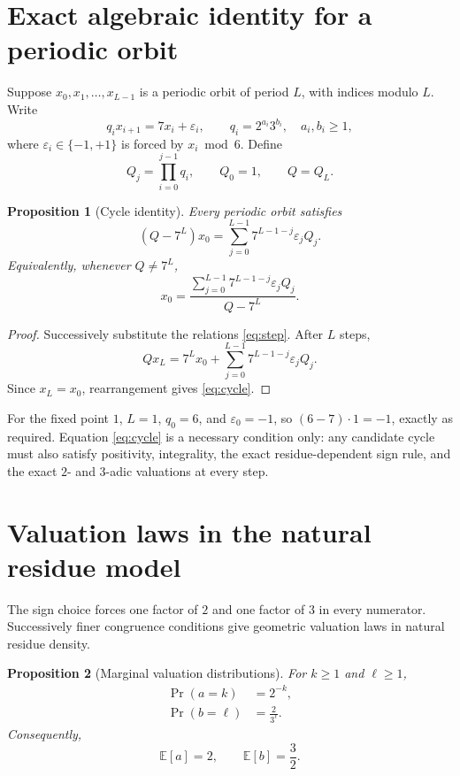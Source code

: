 \documentclass[11pt]{article}
\newtheorem{proposition}{Proposition}
\begin{document}
\section{Exact algebraic identity for a periodic orbit}
Suppose $x_0,x_1,\ldots,x_{L-1}$ is a periodic orbit of period $L$, with indices modulo $L$. Write
\begin{equation}
q_i x_{i+1}=7x_i+\varepsilon_i,
\qquad q_i=2^{a_i}3^{b_i},\quad a_i,b_i\ge1,
\label{eq:step}
\end{equation}
where $\varepsilon_i\in\{-1,+1\}$ is forced by $x_i\bmod6$. Define
\[
Q_j=\prod_{i=0}^{j-1}q_i,\qquad Q_0=1,\qquad Q=Q_L.
\]

\begin{proposition}[Cycle identity]
Every periodic orbit satisfies
\begin{equation}
(Q-7^L)x_0=\sum_{j=0}^{L-1}7^{L-1-j}\varepsilon_j Q_j.
\label{eq:cycle}
\end{equation}
Equivalently, whenever $Q\ne7^L$,
\begin{equation}
x_0=\frac{\sum_{j=0}^{L-1}7^{L-1-j}\varepsilon_j Q_j}{Q-7^L}.
\end{equation}
\end{proposition}
\begin{proof}
Successively substitute the relations \eqref{eq:step}. After $L$ steps,
\[
Qx_L=7^Lx_0+\sum_{j=0}^{L-1}7^{L-1-j}\varepsilon_jQ_j.
\]
Since $x_L=x_0$, rearrangement gives \eqref{eq:cycle}.
\end{proof}

For the fixed point $1$, $L=1$, $q_0=6$, and $\varepsilon_0=-1$, so $(6-7)\cdot1=-1$, exactly as required. Equation \eqref{eq:cycle} is a necessary condition only: any candidate cycle must also satisfy positivity, integrality, the exact residue-dependent sign rule, and the exact $2$- and $3$-adic valuations at every step.

\section{Valuation laws in the natural residue model}
The sign choice forces one factor of $2$ and one factor of $3$ in every numerator. Successively finer congruence conditions give geometric valuation laws in natural residue density.

\begin{proposition}[Marginal valuation distributions]
For $k\ge1$ and $\ell\ge1$,
\begin{align}
\Pr(a=k)&=2^{-k},\label{eq:a-dist}\\
\Pr(b=\ell)&=\frac{2}{3^{\ell}}.\label{eq:b-dist}
\end{align}
Consequently,
\[
\mathbb E[a]=2,\qquad \mathbb E[b]=\frac32.
\]
\end{proposition}
\end{document}
